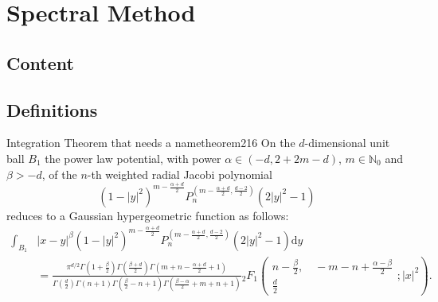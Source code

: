 \chapter{Spectral Method}
\label{chap:spectral-method}

\section{Content}


\section{Definitions}


















\begin{theorem}{Integration Theorem that needs a name}{theorem216}
  On the $d$-dimensional unit ball $B_1$ the power law potential, with power $\alpha \in(-d,2+2m-d)$, $m\in\mathbb{N}_0$ and $\beta>-d$, of the $n$-th weighted radial Jacobi polynomial $$(1-|y|^2)^{m-\frac{\alpha+d}{2}}P_n^{(m-\frac{\alpha+d}{2},\frac{d-2}{2})}(2|y|^2-1)$$ reduces to a Gaussian hypergeometric function as follows:
  \begin{align*}
    \int_{B_1} & |x-y|^\beta (1-|y|^2)^{m-\frac{\alpha+d}{2}} P_n^{(m-\frac{\alpha+d}{2},\frac{d-2}{2})}(2|y|^2-1) \mathrm{d}y                                                                                                                                                                                                                                                                                               \\
               & = \tfrac{\pi ^{d/2} \Gamma \left(1+\frac{\beta}{2}\right) \Gamma \left(\frac{\beta+d}{2}\right) \Gamma \left(m+n-\frac{\alpha+d}{2}+1\right)}{\Gamma \left(\frac{d}{2}\right) \Gamma (n+1) \Gamma \left(\frac{\beta}{2}-n+1\right) \Gamma \left(\frac{\beta-\alpha}{2}+m+n+1\right)}{}_2F_1\left(\begin{matrix}n-\frac{\beta}{2}, \quad -m-n+\frac{\alpha-\beta}{2} \\\frac{d}{2}\end{matrix};|x|^2\right).
  \end{align*}
\end{theorem}

